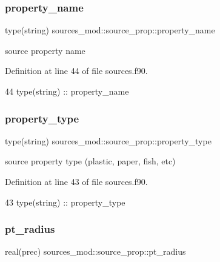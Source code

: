 \subsubsection{\texorpdfstring{property\+\_\+name}{property\_name}}
{\footnotesize\ttfamily type(string) sources\+\_\+mod\+::source\+\_\+prop\+::property\+\_\+name\hspace{0.3cm}{\ttfamily [private]}}



source property name 



Definition at line 44 of file sources.\+f90.


\begin{DoxyCode}
44         \textcolor{keywordtype}{type}(string) :: property\_name
\end{DoxyCode}
\mbox{\label{structsources__mod_1_1source__prop_a071dfa986af6218c0add70010ab2a37e}} 
\subsubsection{\texorpdfstring{property\+\_\+type}{property\_type}}
{\footnotesize\ttfamily type(string) sources\+\_\+mod\+::source\+\_\+prop\+::property\+\_\+type\hspace{0.3cm}{\ttfamily [private]}}



source property type (plastic, paper, fish, etc) 



Definition at line 43 of file sources.\+f90.


\begin{DoxyCode}
43         \textcolor{keywordtype}{type}(string) :: property\_type
\end{DoxyCode}
\mbox{\label{structsources__mod_1_1source__prop_a66219c6ba24db75abf401de5c5fa875d}} 
\subsubsection{\texorpdfstring{pt\+\_\+radius}{pt\_radius}}
{\footnotesize\ttfamily real(prec) sources\+\_\+mod\+::source\+\_\+prop\+::pt\+\_\+radius\hspace{0.3cm}{\ttfamily [private]}}



